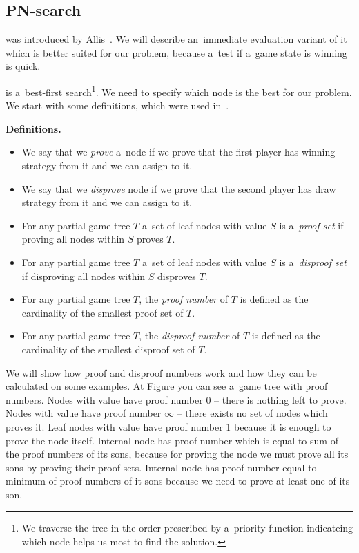 \subsection{PN-search}

 was introduced by Allis~\cite{allis}. We will describe an~immediate evaluation
variant of it which is better suited for our problem, because a~test if a~game state is winning is
quick.

 is a~best-first search\footnote{We traverse the tree in the order prescribed by a~priority
function indicateing which node helps us most to find the solution.}. We need to specify which node is the best for our problem.
We start with some definitions, which were used in~\cite{allis}. 

\medskip\noindent
\textbf{Definitions.}

\begin{itemize}
\item
We say that we \emph{prove} a~node if we prove that the first player has winning strategy
from it and we can assign  to it. 

\item
We say that we \emph{disprove} node if we prove that the second player has draw strategy
from it and we can assign  to it. 

\item
For any partial game tree $T$ a~set of leaf nodes with value  $S$ is a~{\sl proof set}
if proving all nodes within $S$ proves $T$.

\item
For any partial game tree $T$ a~set of leaf nodes with value  $S$ is a~{\sl disproof set}
if disproving all nodes within $S$ disproves $T$.

\item
For any partial game tree $T$, the {\sl proof number} of $T$ is defined as the 
cardinality of the smallest proof set of $T$.

\item
For any partial game tree $T$, the {\sl disproof number} of $T$ is defined as the 
cardinality of the smallest disproof set of $T$.
\end{itemize}

We will show how proof and disproof numbers work and how they can be calculated
on some examples. At Figure  you can see a~game tree with proof
numbers. Nodes with value  have proof number 0 -- there is nothing
left to prove. Nodes with value  have proof number $ \infty $ --
there exists no set of nodes which proves it. Leaf nodes with value
 have proof number 1 because it is enough to prove the node
itself. Internal  node has proof number which is equal to sum of the
proof numbers of its sons, because for proving the  node we must
prove all its sons by proving their proof sets. Internal  node has
proof number equal to minimum of proof numbers of it sons because we need to
prove at least one of its son.

